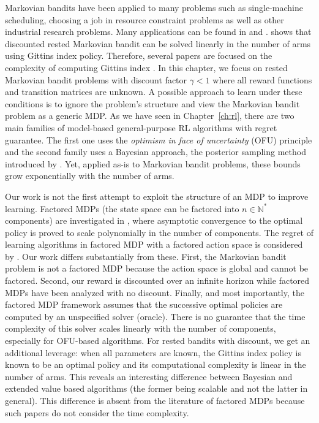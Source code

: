 Markovian bandits have been applied to many problems such as single-machine scheduling, choosing a job in  resource constraint problems  as well as other  industrial research problems. Many applications can be found in \cite[Section 3.6]{puterman2014markov} and \cite{gittins2011multi}. \cite{gittins1979bandit} shows that discounted rested Markovian bandit can be solved linearly in the number of arms using Gittins index policy. Therefore, several papers are   focused  on the complexity of  computing  Gittins index \cite{chakravorty2014multi,gast2022computing}.
In this chapter, we focus on rested Markovian bandit problems with discount factor $\gamma<1$ where all
reward functions and transition matrices are unknown.
A possible approach to learn under these conditions is to ignore the problem's structure and view the Markovian bandit problem as a generic MDP.
As we have seen in Chapter~\ref{ch:rl}, there are two main families of model-based general-purpose RL algorithms with regret guarantee. The first one uses the \emph{optimism in face of uncertainty} (OFU) principle and the second family uses a Bayesian approach, the posterior sampling method introduced by \cite{thompson1933likelihood}.
Yet, applied as-is to Markovian bandit problems, these bounds grow exponentially with the number of arms.

Our work is not the first attempt to exploit the structure of an MDP to improve
learning.  Factored MDPs (the state space can be
factored into $n\in\mathbb{N}^*$ components) are investigated in
\cite{guestrin2003efficient}, where asymptotic convergence to
the optimal policy is proved to scale polynomially in the number of components.
The regret of learning algorithms in factored MDP with a factored action space
is considered by 
\cite{tian2020towards,rosenberg2020oracle,xu2020reinforcement,osband2014near}. Our work differs substantially from these. 
First, the Markovian bandit problem is not a factored MDP because the action
space is global and cannot be factored. 
Second, our reward is discounted over an infinite horizon while factored MDPs have been analyzed with no discount.
Finally, and most importantly, the factored MDP framework assumes that the successive optimal policies are  computed by an unspecified solver (oracle). There is no guarantee that the time complexity of this solver scales linearly with the number of components, especially for OFU-based algorithms.
For rested bandits with discount, we get an  additional leverage: when all parameters are known, the Gittins index policy is known to be an optimal policy and its computational complexity is linear in the number of arms. This reveals an interesting difference between Bayesian and extended value based algorithms (the former being scalable and not the latter in general). This difference is absent from the literature of factored MDPs because such papers do not consider the time complexity.

